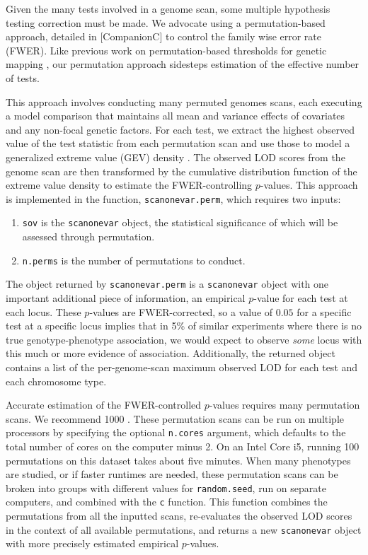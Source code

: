 \documentclass[9pt,twocolumn,twoside]{gsag3jnl}
\begin{document}
Given the many tests involved in a genome scan, some multiple hypothesis testing correction must be made.
We advocate using a permutation-based approach, detailed in [CompanionC] to control the family wise error rate (FWER).
Like previous work on permutation-based thresholds for genetic mapping \citep{Churchill1994,Carlborg2002}, our permutation approach sidesteps estimation of the effective number of tests.

This approach involves conducting many permuted genomes scans, each executing a model comparison that maintains all mean and variance effects of covariates and any non-focal genetic factors.
For each test, we extract the highest observed value of the test statistic from each permutation scan and use those to model a generalized extreme value (GEV) density \citep{Stephenson2002}.
The observed LOD scores from the genome scan are then transformed by the cumulative distribution function of the extreme value density to estimate the FWER-controlling $p$-values.
This approach is implemented in the function, \texttt{scanonevar.perm}, which requires two inputs:

\begin{enumerate}
	\item \texttt{sov} is the \texttt{scanonevar} object, the statistical significance of which will be assessed through permutation.
	\item \texttt{n.perms} is the number of permutations to conduct.
\end{enumerate}

The object returned by \texttt{scanonevar.perm} is a \texttt{scanonevar} object with one important additional piece of information, an empirical $p$-value for each test at each locus.
These $p$-values are FWER-corrected, so a value of $0.05$ for a specific test at a specific locus implies that in 5\% of similar experiments where there is no true genotype-phenotype association, we would expect to observe \textit{some} locus with this much or more evidence of association.
Additionally, the returned object contains a list of the per-genome-scan maximum observed LOD for each test and each chromosome type.

Accurate estimation of the FWER-controlled $p$-values requires many permutation scans.
We recommend 1000 \citep{Churchill1994,Carlborg2002}.
These permutation scans can be run on multiple processors by specifying the optional \texttt{n.cores} argument, which defaults to the total number of cores on the computer minus 2.
On an Intel Core i5, running 100 permutations on this dataset takes about five minutes.
When many phenotypes are studied, or if faster runtimes are needed, these permutation scans can be broken into groups with different values for \texttt{random.seed}, run on separate computers, and combined with the \texttt{c} function.
This function combines the permutations from all the inputted scans, re-evaluates the observed LOD scores in the context of all available permutations, and returns a new \texttt{scanonevar} object with more precisely estimated empirical $p$-values.
\end{document}

